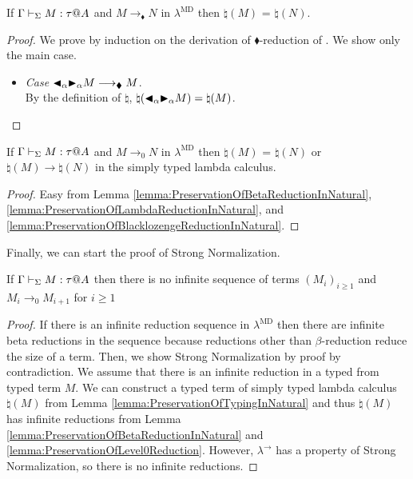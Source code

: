 \begin{lemma}
    \label{lemma:PreservationOfBlacklozengeReductionInNatural}
    If $\G \V M:\tau@A$ and $M \longrightarrow_\blacklozenge N$ in $\lambda^{\text{MD}}$
    then $\natural(M)$ =  $\natural(N)$.
\end{lemma}

\begin{proof}
    We prove by induction on the derivation of $\blacklozenge$-reduction of \LMD.
    We show only the main case.
    \begin{itemize}
        \item \textit{Case} \( {\mathop{\blacktriangleleft}}_\alpha {\mathop{\blacktriangleright}}_\alpha M \longrightarrow_\blacklozenge M \).\\
            By the definition of $\natural$, \(\natural({\mathop{\blacktriangleleft}}_\alpha {\mathop{\blacktriangleright}}_\alpha M) = \natural(M)\).
    \end{itemize}
\end{proof}

\begin{lemma}
    \label{lemma:PreservationOfLevel0Reduction}
    If $\G \V M:\tau@A$ and $M \longrightarrow_0 N$ in $\lambda^{\text{MD}}$
    then $\natural(M)$ =  $\natural(N)$ or \( \natural(M) \longrightarrow \natural(N) \) in the simply typed lambda calculus.
\end{lemma}

\begin{proof}
    Easy from Lemma \ref{lemma:PreservationOfBetaReductionInNatural},
    \ref{lemma:PreservationOfLambdaReductionInNatural}, and
    \ref{lemma:PreservationOfBlacklozengeReductionInNatural}.
\end{proof}

Finally, we can start the proof of Strong Normalization.

\begin{lemma}
    \label{lemma:StrongNormalizationOfLevel0Reduction}
    If \( \G\V M:\tau@A \) then there is no infinite sequence of terms $(M_i)_{i\ge1}$ and $M_i \longrightarrow_{0} M_{i+1}$ for $i\ge 1$
\end{lemma}

\begin{proof}
    If there is an infinite reduction sequence in $\lambda^{\text{MD}}$ then
    there are infinite beta reductions in the sequence because reductions other
    than $\beta$-reduction reduce the size of a term.  Then, we show Strong
    Normalization by proof by contradiction.  We assume that there is an
    infinite reduction in a typed \LMD from typed term $M$.  We can construct a
    typed term of simply typed lambda calculus $\natural(M)$ from Lemma
    \ref{lemma:PreservationOfTypingInNatural} and thus $\natural(M)$ has
    infinite reductions from Lemma
    \ref{lemma:PreservationOfBetaReductionInNatural} and
    \ref{lemma:PreservationOfLevel0Reduction}. However, $\lambda^\to$ has a
    property of Strong Normalization\cite{TAPL}, so there is no infinite
    reductions.
\end{proof}


